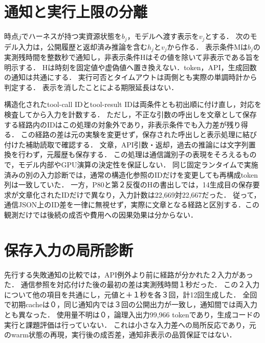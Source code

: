 \documentclass[uplatex,a4paper,twocolumn,10pt]{jsarticle}
\begin{document}
\section{通知と実行上限の分離}
時点$j$でハーネスが持つ実資源状態を$b_j$，モデルへ渡す表示を$v_j$とする．
次のモデル入力は，公開履歴と返却済み推論を含む$h_j$と$v_j$から作る．
表示条件Mは$b_j$の実測残時間を整数秒で通知し，非表示条件Hはその値を除いて非表示である旨を明示する．
Hは時刻を固定値や虚偽値へ置き換えない．token，API，生成回数の通知は共通にする．
実行可否とタイムアウトは両側とも実際の単調時計から判定する．
表示を消したことによる期限延長はない．

構造化されたtool-call IDとtool-result IDは両条件とも初出順に付け直し，対応を検査してから入力を計数する．
ただし，不正な引数の呼出しを文章として保存する経路内のIDはこの処理の対象外であり，非表示条件でも入力差が残り得る．
この経路の差は元の実験を変更せず，保存された呼出しと表示処理に結び付けた補助読取で確認する．
文章，API引数・返却，過去の推論には文字列置換を行わず，元履歴も保存する．
この処理は通信識別子の表現をそろえるもので，モデル内部やGPU演算の決定性を保証しない．
同じ固定ランタイムで実施済みの別の入力診断では，通常の構造化参照のIDだけを変更しても再構成token列は一致していた．
一方，P80と第２反復のHの書出しでは，14生成目の保存要求が文章化されたIDだけで異なり，入力計数は22,669対22,667だった．
従って，通信JSON上のID差を一律に無視せず，実際に文章となる経路と区別する．この観測だけでは後続の成否や費用への因果効果は分からない．

\section{保存入力の局所診断}
先行する失敗通知の比較では，API例外より前に経路が分かれた２入力があった．
通信参照を対応付けた後の最初の差は実測残時間１秒だった．
この２入力について他の項目を共通にし，元値と＋１秒を各３回，計12回生成した．
全回で初期cacheは０，同じ通知内では３回の公開出力が一致し，通知間では両入力とも異なった．
使用量不明は０，論理入出力99,966 tokenであり，生成コードの実行と課題評価は行っていない．
これは小さな入力差への局所反応であり，元のwarm状態の再現，実行後の成否差，通知非表示の品質保証ではない．
\end{document}
